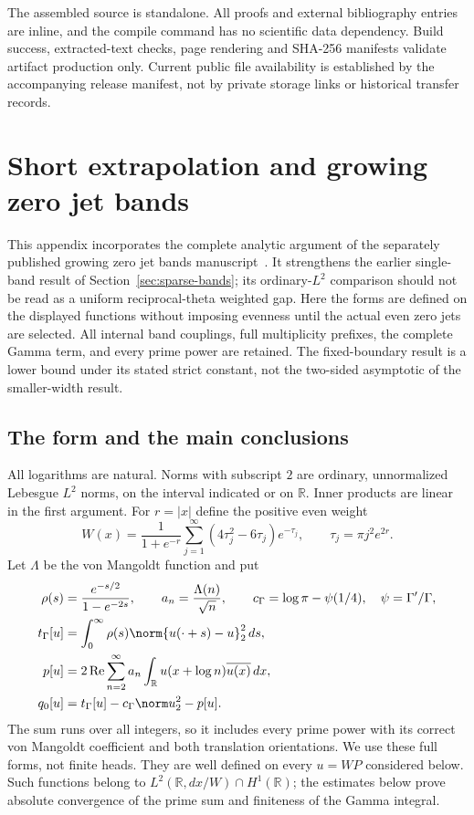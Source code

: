 \documentclass[11pt,a4paper]{article}
\numberwithin{equation}{section}
\theoremstyle{definition}\newtheorem{definition}[theorem]{Definition}
\theoremstyle{remark}\newtheorem{remark}[theorem]{Remark}
\newcommand{\R}{\mathbb R}\newcommand{\C}{\mathbb C}\newcommand{\N}{\mathbb N}
\newcommand{\tg}{t_\Gamma}\newcommand{\cg}{c_\Gamma}
\DeclareMathOperator{\Rea}{Re}\DeclareMathOperator{\Ima}{Im}
\begin{document}
The assembled source is standalone. All proofs and external bibliography entries are inline, and the compile command has no scientific data dependency. Build success, extracted-text checks, page rendering and SHA-256 manifests validate artifact production only. Current public file availability is established by the accompanying release manifest, not by private storage links or historical transfer records.

\section{Short extrapolation and growing zero jet bands}\label{app:growing-zero-bands}
This appendix incorporates the complete analytic argument of the separately
published growing zero jet bands manuscript~\cite{ChoiGrowingBands}. It strengthens the earlier
single-band result of Section~\ref{sec:sparse-bands}; its ordinary-$L^2$
comparison should not be read as a uniform reciprocal-theta weighted gap.
Here the forms are defined on the displayed functions without imposing evenness
until the actual even zero jets are selected. All internal band couplings,
full multiplicity prefixes, the complete Gamma term, and every prime power are
retained. The fixed-boundary result is a lower bound under its stated strict
constant, not the two-sided asymptotic of the smaller-width result.

\subsection{The form and the main conclusions}
All logarithms are natural. Norms with subscript $2$ are ordinary,
unnormalized Lebesgue $L^2$ norms, on the interval indicated or on $\R$.
Inner products are linear in the first argument.
For $r=|x|$ define the positive even weight
\begin{equation}\label{gzb:eq:weight}
 W(x)=\frac{1}{1+e^{-r}}
 \sum_{j=1}^{\infty}(4\tau_j^2-6\tau_j)e^{-\tau_j},
 \qquad \tau_j=\pi j^2e^{2r}.
\end{equation}
Let $\Lambda$ be the von Mangoldt function and put
\begin{equation}\label{gzb:eq:forms}
\begin{split}
 \rho(s)&=\frac{e^{-s/2}}{1-e^{-2s}},\qquad
 a_n=\frac{\Lambda(n)}{\sqrt n},\qquad
 \cg=\log\pi-\psi(1/4),\quad \psi=\Gamma'/\Gamma,\\
 \tg[u]&=\int_0^\infty\rho(s)
               \norm{u(\cdot+s)-u}_2^2\,ds,\\
 p[u]&=2\Rea\sum_{n=2}^{\infty}a_n
                  \int_\R u(x+\log n)\overline{u(x)}\,dx,\\
 q_0[u]&=\tg[u]-\cg\norm u_2^2-p[u].
\end{split}
\end{equation}
The sum runs over all integers, so it includes every prime power with its
correct von Mangoldt coefficient and both translation orientations.
We use these full forms, not finite heads. They are well defined on every
$u=WP$ considered below. Such functions belong to
$L^2(\R,dx/W)\cap H^1(\R)$; the estimates below prove absolute convergence
of the prime sum and finiteness of the Gamma integral.
\end{document}
